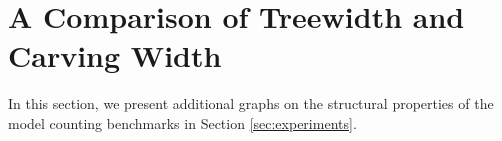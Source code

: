\section{A Comparison of Treewidth and Carving Width}
\label{sec:experiments:graph_analysis}

In this section, we present additional graphs on the structural properties of the model counting benchmarks in Section \ref{sec:experiments}.





